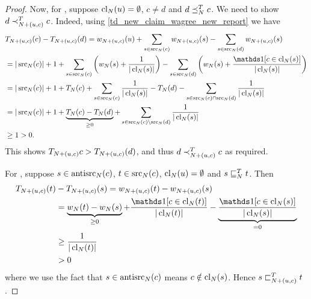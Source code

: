\begin{proof}
    Now, for \freshposresp, suppose $\operatorname{cl}_N(u) = \emptyset$, $c \ne d$ and
    $d \preceq_N^T c$. We need to show $d \prec_{{N} + ({u}, {c})}^T c$. Indeed,
    using \cref{td_new_claim_wagree_new_report} we have
    \begin{align*}
        &T_{\addclaim{N}{u}{c}}(c) - T_{\addclaim{N}{u}{c}}(d)
        = w_{\addclaim{N}{u}{c}}(u)
        + \sum_{s \in \src_N(c)}{
            w_{\addclaim{N}{u}{c}}(s)
        }
        - \sum_{s \in \src_N(d)}{
            w_{\addclaim{N}{u}{c}}(s)
        } \\
        &= |\src_N(c)| + 1
        + \sum_{s \in \src_N(c)}{
            \left(
                w_N(s)
                + \frac{1}{|\claims_N(s)|}
            \right)
        }
        - \sum_{s \in \src_N(d)}{
            \left(
                w_N(s)
                + \frac{\indicator{c \in \claims_N(s)}}{|\claims_N(s)|}
            \right)
        } \\
        &= |\src_N(c)| + 1
        + T_N(c)
        + \sum_{s \in \src_N(c)}{
            \frac{1}{|\claims_N(s)|}
        }
        - T_N(d)
        - \sum_{s \in \src_N(c) \cap \src_N(d)}{
            \frac{1}{|\claims_N(s)|}
        } \\
        &= |\src_N(c)| + 1
        + \underbrace{T_N(c) - T_N(d)}_{\ge 0}
        + \sum_{s \in \src_N(c) \setminus \src_N(d)}{
            \frac{1}{|\claims_N(s)|}
        } \\
        &\ge 1 > 0.
    \end{align*}
    This shows $T_{{N} + ({u}, {c})}{c} > T_{{N} + ({u}, {c})}(d)$, and
    thus $d \prec_{{N} + ({u}, {c})}^T c$ as required.

    For \sourceposresp{}, suppose $s \in \operatorname{antisrc}_N(c)$, $t \in \operatorname{src}_N(c)$,
    $\operatorname{cl}_N(u) = \emptyset$ and $s \sqsubseteq_N^T t$. Then
    \begin{align*}
        T_{\addclaim{N}{u}{c}}(t) &- T_{\addclaim{N}{u}{c}}(s)
        = w_{\addclaim{N}{u}{c}}(t) - w_{\addclaim{N}{u}{c}}(s) \\
        &= \underbrace{w_N(t) - w_N(s)}_{\ge 0}
        + \frac{\indicator{c \in \claims_N(t)}}{|\claims_N(t)|}
        - \underbrace{
            \frac{\indicator{c \in \claims_N(s)}}{|\claims_N(s)|}
        }_{= 0} \\
        &\ge \frac{1}{|\claims_N(t)|} \\
        &> 0
    \end{align*}
    where we use the fact that $s \in \operatorname{antisrc}_N(c)$ means $c \notin
    \operatorname{cl}_N(s)$. Hence $s \sqsubset_{{N} + ({u}, {c})}^T t$.


\end{proof}
